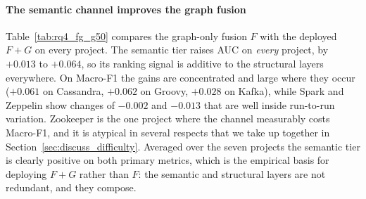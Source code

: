 \documentclass[final,5p,times,twocolumn]{elsarticle}
\theoremstyle{plain}
\begin{document}
\paragraph{The semantic channel improves the graph fusion}
Table~\ref{tab:rq4_fg_g50} compares the graph-only fusion $F$ with the deployed $F{+}G$ on
every project. The semantic tier raises AUC on \emph{every} project, by $+0.013$ to $+0.064$,
so its ranking signal is additive to the structural layers everywhere. On Macro-F1 the
gains are concentrated and large where they occur ($+0.061$ on Cassandra, $+0.062$ on
Groovy, $+0.028$ on Kafka), while Spark and Zeppelin show changes of $-0.002$ and
$-0.013$ that are well inside run-to-run variation. Zookeeper is the one project where
the channel measurably costs Macro-F1, and it is atypical in several respects that we
take up together in Section~\ref{sec:discuss_difficulty}. Averaged over the seven projects the
semantic tier is clearly positive on both primary metrics, which is the empirical basis
for deploying $F{+}G$ rather than $F$: the semantic and structural layers are not
redundant, and they compose.
\end{document}

